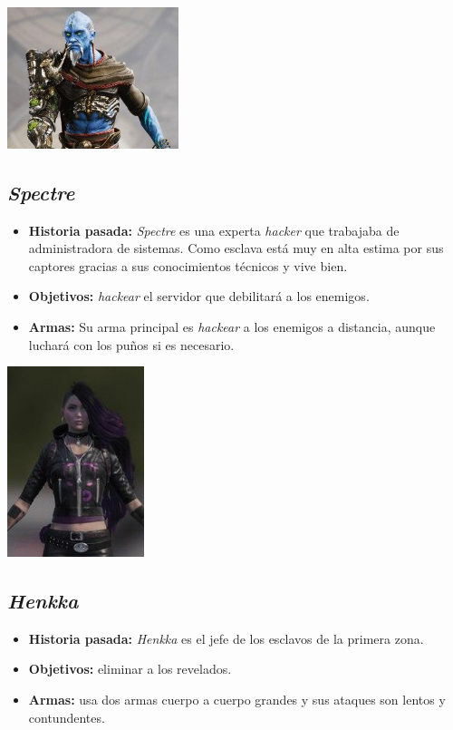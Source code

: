 \documentclass[twoside]{article}
\begin{document}
\pagestyle{notsection}

\begin{center}
\includegraphics[width=5cm]{./images/serj.jpg}
\end{center}

\subsection{\textit{Spectre}}
\begin{itemize}
\item \textbf{Historia pasada:} \textit{Spectre} es una experta \textit{hacker} que trabajaba de administradora de sistemas. Como esclava está muy en alta estima por sus captores gracias a sus conocimientos técnicos y vive bien. 
\item \textbf{Objetivos:} \textit{hackear} el servidor que debilitará a los enemigos.
\item \textbf{Armas:} Su arma principal es \textit{hackear} a los enemigos a distancia, aunque luchará con los puños si es necesario.
\end{itemize}

\begin{center}
\includegraphics[width=4cm]{./images/spectre.jpg}
\end{center}

\newpage
\subsection{\textit{Henkka}}
\begin{itemize}
\item \textbf{Historia pasada:} \textit{Henkka} es el jefe de los esclavos de la primera zona.
\item \textbf{Objetivos:} eliminar a los revelados.
\item \textbf{Armas:} usa dos armas cuerpo a cuerpo grandes y sus ataques son lentos y contundentes. 
\end{itemize}
\end{document}
